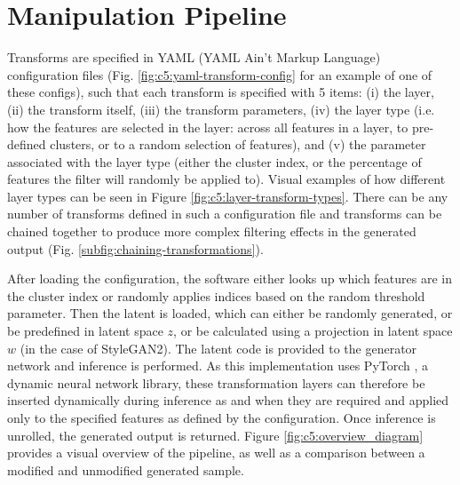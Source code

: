 \section{Manipulation Pipeline}

Transforms are specified in YAML (YAML Ain't Markup Language) configuration files \citep{ben2009yaml} (Fig. \ref{fig:c5:yaml-transform-config} for an example of one of these configs), such that each transform is specified with 5 items: (i) the layer, (ii) the transform itself, (iii) the transform parameters, (iv) the layer type (i.e. how the features are selected in the layer: across all features in a layer, to pre-defined clusters, or to a random selection of features), and (v) the parameter associated with the layer type (either the cluster index, or the percentage of features the filter will randomly be applied to). 
Visual examples of how different layer types can be seen in Figure \ref{fig:c5:layer-transform-types}.
There can be any number of transforms defined in such a configuration file and transforms can be chained together to produce more complex filtering effects in the generated output  (Fig. \ref{subfig:chaining-transformations}).

After loading the configuration, the software either looks up which features are in the cluster index or randomly applies indices based on the random threshold parameter. 
Then the latent is loaded, which can either be randomly generated, or be predefined in latent space $z$, or be calculated using a projection in latent space $w$ \citep{abdal2019image2stylegan,karras2019analyzing} (in the case of StyleGAN2). The latent code is provided to the generator network and inference is performed. 
As this implementation uses PyTorch \citep{paszke2019pytorch}, a dynamic neural network library, these transformation layers can therefore be inserted dynamically during inference as and when they are required and applied only to the specified features as defined by the configuration. 
Once inference is unrolled, the generated output is returned. Figure \ref{fig:c5:overview_diagram} provides a visual overview of the pipeline, as well as a comparison between a modified and unmodified generated sample.

